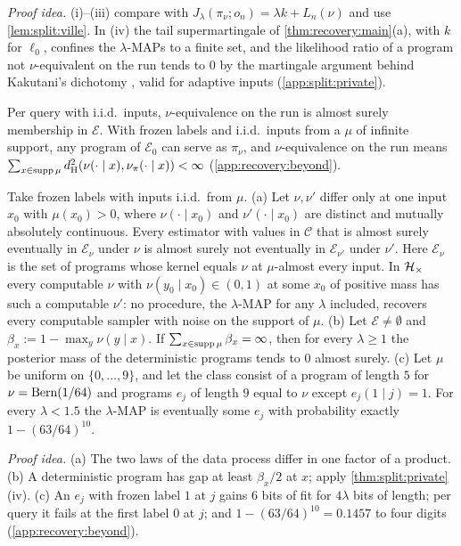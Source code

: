 \emph{Proof idea.} (i)--(iii) compare with $J_\lambda(\pi_\nu;o_n)=\lambda k+L_n(\nu)$ and use \cref{lem:split:ville}. In (iv) the tail supermartingale of \cref{thm:recovery:main}(a), with $k$ for $\ell_0$, confines the $\lambda$-MAPs to a finite set, and the likelihood ratio of a program not $\nu$-equivalent on the run tends to $0$ by the martingale argument behind Kakutani's dichotomy \citep{kakutani1948equivalence}, valid for adaptive inputs (\cref{app:split:private}).

Per query with i.i.d.\ inputs, $\nu$-equivalence on the run is almost surely membership in $\mathcal E$. With frozen labels and i.i.d.\ inputs from a $\mu$ of infinite support, any program of $\mathcal E_0$ can serve as $\pi_\nu$, and $\nu$-equivalence on the run means $\sum_{x\in\operatorname{supp}\mu}d_{\mathrm{H}}^{2}(\nu(\cdot\mid x),\nu_\pi(\cdot\mid x))<\infty$ (\cref{app:recovery:beyond}).

\begin{proposition}\label{prop:recovery:frozen}
Take frozen labels with inputs i.i.d.\ from $\mu$.
(a) Let $\nu,\nu'$ differ only at one input $x_0$ with $\mu(x_0)>0$, where $\nu(\cdot\mid x_0)$ and $\nu'(\cdot\mid x_0)$ are distinct and mutually absolutely continuous. Every estimator with values in $\mathcal C$ that is almost surely eventually in $\mathcal E_\nu$ under $\nu$ is almost surely not eventually in $\mathcal E_{\nu'}$ under $\nu'$. Here $\mathcal E_\nu$ is the set of programs whose kernel equals $\nu$ at $\mu$-almost every input. In $\mathcal{H}_{\times}$ every computable $\nu$ with $\nu(y_0\mid x_0)\in(0,1)$ at some $x_0$ of positive mass has such a computable $\nu'$: no procedure, the $\lambda$-MAP for any $\lambda$ included, recovers every computable sampler with noise on the support of $\mu$.
(b) Let $\mathcal E\ne\emptyset$ and $\beta_x:=1-\max_y\nu(y\mid x)$. If $\sum_{x\in\operatorname{supp}\mu}\beta_x=\infty$, then for every $\lambda\ge1$ the posterior mass of the deterministic programs tends to $0$ almost surely.
(c) Let $\mu$ be uniform on $\{0,\dots,9\}$, and let the class consist of a program of length $5$ for $\nu=\operatorname{Bern}(1/64)$ and programs $e_j$ of length $9$ equal to $\nu$ except $e_j(1\mid j)=1$. For every $\lambda<1.5$ the $\lambda$-MAP is eventually some $e_j$ with probability exactly $1-(63/64)^{10}$.
\end{proposition}

\emph{Proof idea.} (a) The two laws of the data process differ in one factor of a product. (b) A deterministic program has gap at least $\beta_x/2$ at $x$; apply \cref{thm:split:private}(iv). (c) An $e_j$ with frozen label $1$ at $j$ gains $6$ bits of fit for $4\lambda$ bits of length; per query it fails at the first label $0$ at $j$; and $1-(63/64)^{10}=0.1457$ to four digits (\cref{app:recovery:beyond}).

